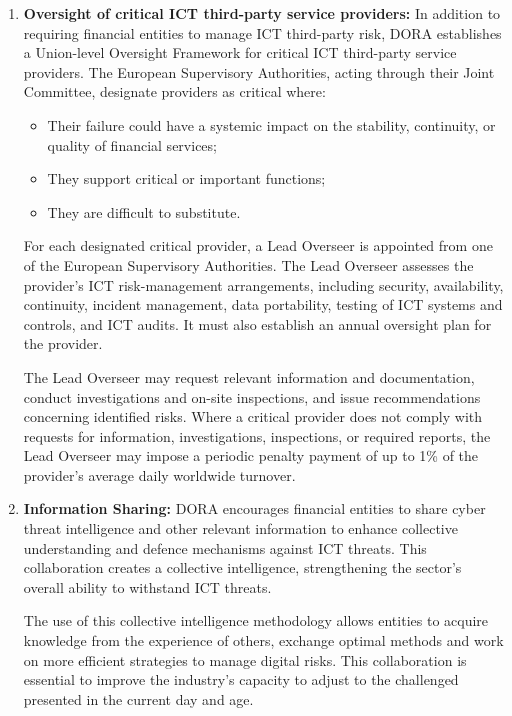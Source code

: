 \begin{enumerate}
    \item \textbf{Oversight of critical \ac{ICT} third-party service providers:}
    In addition to requiring financial entities to manage \ac{ICT} third-party risk, \ac{DORA} establishes a Union-level Oversight Framework for critical \ac{ICT} third-party service providers. The European Supervisory Authorities, acting through their Joint Committee, designate providers as critical where:
    \begin{itemize}
        \item Their failure could have a systemic impact on the stability, continuity, or quality of financial services;
        \item They support critical or important functions;
        \item They are difficult to substitute.
    \end{itemize}  
    
    For each designated critical provider, a Lead Overseer is appointed from one of the European Supervisory Authorities. The Lead Overseer assesses the provider's \ac{ICT} risk-management arrangements, including security, availability, continuity, incident management, data portability, testing of \ac{ICT} systems and controls, and \ac{ICT} audits. It must also establish an annual oversight plan for the provider.
    
    The Lead Overseer may request relevant information and documentation, conduct investigations and on-site inspections, and issue recommendations concerning identified risks. Where a critical provider does not comply with requests for information, investigations, inspections, or required reports, the Lead Overseer may impose a periodic penalty payment of up to 1\% of the provider's average daily worldwide turnover.\cite{DORA}
    
    \item \textbf{Information Sharing:}
    \ac{DORA} encourages financial entities to share cyber threat intelligence and other relevant information to enhance collective understanding and defence mechanisms against \ac{ICT} threats.
    This collaboration creates a collective intelligence, strengthening the sector's overall ability to withstand \ac{ICT} threats.
    
    The use of this collective intelligence methodology allows entities to acquire knowledge from the experience of others, exchange optimal methods and work on more efficient strategies to manage digital risks. This collaboration is essential to improve the industry's capacity to adjust to the challenged presented in the current day and age.
\end{enumerate}

